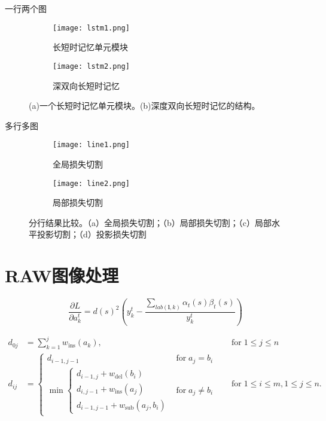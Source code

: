 \documentclass[winfonts]{njuthesis}
\begin{document}
一行两个图
\begin{figure}[ht!]
    \centering
    \begin{subfigure}{.5\textwidth}
    	\centering
        \texttt{[image: lstm1.png]}
        \caption{长短时记忆单元模块}
    \end{subfigure}
    \begin{subfigure}{.4\textwidth}
    	\centering
        \texttt{[image: lstm2.png]}
        \caption{深双向长短时记忆}
        \label{fig:lstm2}
    \end{subfigure}
    \caption{(a)一个长短时记忆单元模块。(b)深度双向长短时记忆的结构。}
\label{fig:lstm}
\end{figure}

多行多图
\begin{figure}[ht!]
    \centering
    \begin{subfigure}{\textwidth}
        \centering
        \texttt{[image: line1.png]}
        \caption{全局损失切割}
        \label{fig:line1}
    \end{subfigure}
    \begin{subfigure}{\textwidth}
    	\centering
        \texttt{[image: line2.png]}
        \caption{局部损失切割}
        \label{fig:line2}
    \end{subfigure}
    \caption{分行结果比较。（a）全局损失切割；（b）局部损失切割；（c）局部水平投影切割；（d）投影损失切割}
\end{figure}

\newpage %


\section{RAW图像处理}

\begin{equation}
\frac{\partial L}{\partial a_{k}^t} = {d(s)}^2 (y_{k}^t - \frac{\sum_{lab(\mathbf{l},k)} \alpha_t(s)\beta_t(s) }{y_{k}^t} )
\end{equation}

\begin{equation}
\begin{aligned}
d_{{0j}}&=\sum _{{k=1}}^{{j}}w_{{\mathrm  {ins}}}(a_{{k}}),\quad &{\text{for}}\;1\leq j\leq n\\
d_{{ij}}&={\begin{cases}d_{{i-1,j-1}}&{\text{for}}\;a_{{j}}=b_{{i}}\\\min {\begin{cases}d_{{i-1,j}}+w_{{\mathrm  {del}}}(b_{{i}})\\d_{{i,j-1}}+w_{{\mathrm  {ins}}}(a_{{j}})\\d_{{i-1,j-1}}+w_{{\mathrm  {sub}}}(a_{{j}},b_{{i}})\end{cases}}&{\text{for}}\;a_{{j}}\neq b_{{i}}\end{cases}}\quad &{\text{for}}\;1\leq i\leq m,1\leq j\leq n.
\end{aligned}
\end{equation}
\end{document}
